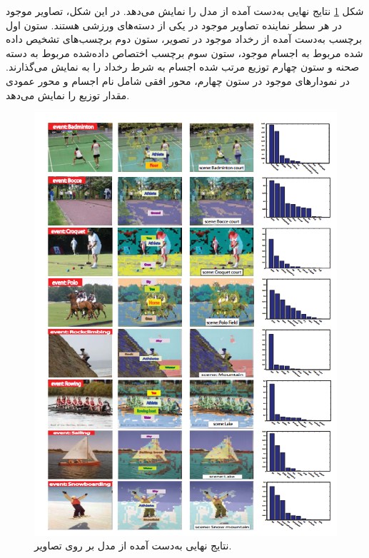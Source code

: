 \begin{enumerate}
	شکل
	\ref{fig:liR}
	نتایج نهایی به‌دست آمده از مدل را نمایش می‌دهد. در این شکل، تصاویر موجود در هر سطر نماینده تصاویر موجود در یکی از دسته‌های ورزشی هستند. ستون اول برچسب به‌دست آمده از رخداد موجود در تصویر، ستون دوم برچسب‌های تشخیص داده شده مربوط به اجسام موجود، ستون سوم برچسب اختصاص داده‌شده مربوط به دسته صحنه و ستون چهارم توزیع مرتب شده اجسام به شرط رخداد را به نمایش می‌گذارند. در نمودارهای موجود در ستون چهارم، محور افقی شامل نام اجسام و محور عمودی مقدار توزیع را نمایش می‌دهد.
	
	\begin{figure}
		\center
		\includegraphics[height=0.9\textheight]{./Imgs/li2007and_res1.png}
		\caption{نتایج نهایی به‌دست آمده از مدل بر روی تصاویر. \cite{li2007and}}
		\label{fig:liR}
	\end{figure}
	
	
	
\end{enumerate}

